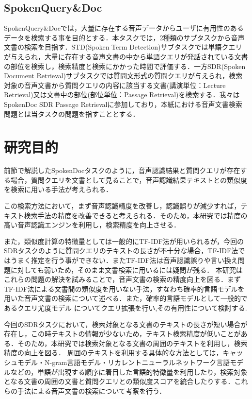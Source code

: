 \subsection{SpokenQuery\&Doc}
SpokenQuery\&Docでは，大量に存在する音声データからユーザに有用性のあるデータを検索する事を目的とする．本タスクでは，2種類のサブタスクから音声文書の検索を目指す．STD(Spoken Term Detection)サブタスクでは単語クエリが与えられ，大量に存在する音声文書の中から単語クエリが発話されている文書の部位を検索し，検索精度と検索にかかった時間で評価する．一方SDR(Spoken Document Retrieval)サブタスクでは質問文形式の質問クエリが与えられ，検索対象の音声文書から質問クエリの内容に該当する文書(講演単位：Lecture Retrieval)又は文書中の部位(部位単位：Passage Retrieval)を検索する．我々はSpokenDoc SDR Passage Retrievalに参加しており，本紙における音声文書検索問題とは当タスクの問題を指すこととする．

\section{研究目的}
前節で解説したSpokenDocタスクのように，音声認識結果と質問クエリが存在する場合，質問クエリを文書として見ることで，音声認識結果テキストとの類似度を検索に用いる手法が考えられる．

この検索方法において，まず音声認識精度を改善し，認識誤りが減少すれば，テキスト検索手法の精度を改善できると考えられる．そのため，本研究では精度の高い音声認識エンジンを利用し，検索精度を向上させる．

また，類似度計算の特徴量としては一般的にTF-IDF法が用いられるが，今回のSDRタスクのように質問クエリのテキストの長さが不十分な場合，TF-IDF法ではうまく推定を行う事ができない．またTF-IDF法は音声認識誤りや言い換え問題に対しても弱いため，そのまま文書検索に用いるには疑問が残る．
本研究はこれらの問題の解決を試みることで，音声文書の検索の精度向上を図る．まずTF-IDF法による文書間の類似度を用いない手法，すなわち確率的言語モデルを用いた音声文書の検索について述べる．また，確率的言語モデルとして一般的であるクエリ尤度モデル \cite{query_likelihood}についてクエリ拡張を行い,その有用性について検討する.

今回のSDRタスクにおいて，検索対象となる文書のテキストの長さが短い場合が存在し，この時テキストの情報が少ないため，テキスト検索精度が低いことがある．そのため，本研究では検索対象となる文書の周囲のテキストを利用し，検索精度の向上を図る．
周囲のテキストを利用する具体的な方法としては，キャッシュモデル・N-gram言語モデル・リカレントニューラルネットワーク言語モデルなどの，単語が出現する順序に着目した言語的特徴量を利用したり，検索対象となる文書の周囲の文書と質問クエリとの類似度スコアを統合したりする．これらの手法による音声文書の検索について考察を行う．

